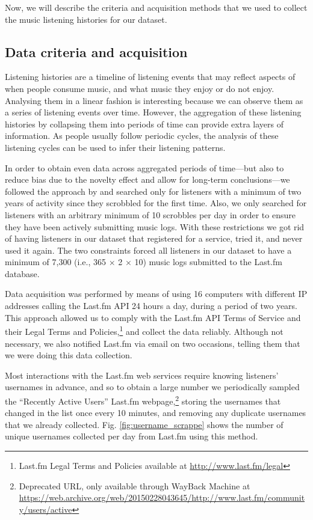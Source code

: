 Now, we will describe the criteria and acquisition methods that we used to collect the music listening histories for our dataset.







\subsection{Data criteria and acquisition}
Listening histories are a timeline of listening events that may reflect  aspects of when people consume music, and what music they enjoy or do not enjoy. Analysing them in a linear fashion is interesting because we can observe them as a series of listening events over time. 
However, the aggregation of these listening histories by collapsing them into periods of time can provide extra layers of information. As people usually follow periodic cycles, the analysis of these listening cycles can be used to infer their listening patterns. 

In order to obtain even data across aggregated periods of time---but also to reduce bias due to the novelty effect and allow for long-term conclusions---we followed the approach by \textcite{baur12listening} and searched only for listeners with a minimum of two years of activity since they scrobbled for the first time.
Also, we only searched for listeners with an arbitrary minimum of 10 scrobbles per day in order to ensure they have been actively submitting music logs. 
With these restrictions we got rid of having listeners in our dataset   that registered for a service, tried it, and never used it again.  The two constraints forced all listeners in our dataset to have a minimum of 7,300 (i.e., 365 $\times$ 2 $\times$ 10) music logs submitted to the Last.fm database. 

Data acquisition was performed by means of using 16 computers with different IP addresses calling the Last.fm API 24 hours a day, during a period of two years. This approach allowed us to comply with the Last.fm API Terms of Service and their Legal Terms and Policies,\footnote{Last.fm Legal Terms and Policies available at \url{http://www.last.fm/legal}} and collect the data reliably. Although not necessary, we also notified Last.fm via email on two occasions, telling them that we were doing this data collection.

Most interactions with the Last.fm web services require knowing listeners' usernames in advance, and so to obtain a large number we periodically sampled the ``Recently Active Users'' Last.fm webpage,\footnote{Deprecated URL, only available through WayBack Machine at \url{https://web.archive.org/web/20150228043645/http://www.last.fm/community/users/active}} storing the usernames that changed in the list once every 10 minutes, and removing any duplicate usernames that we already collected. 
Fig. \ref{fig:username_scrappe} shows the number of unique usernames collected per day from Last.fm using this method. 

